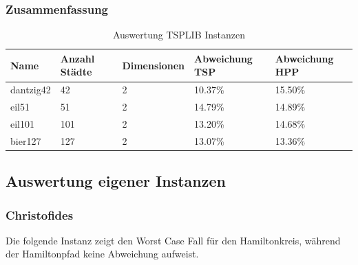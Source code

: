 \documentclass[11pt,a4paper]{article}
\begin{document}
\subsubsection{Zusammenfassung}
    \begin{table}[H]
                \centering
                \begin{tabular}{| p{2.0cm} | p{2.0cm} | p{2.5cm} | p{2.5cm} | p{2.5cm} |}
                    \hline
                    \small{\textbf{Name}} &
                    \small{\textbf{Anzahl Städte}}  & 
                    \small{\textbf{Dimensionen}} & 
                    \small{\textbf{Abweichung TSP}} & 
                    \small{\textbf{Abweichung HPP}} \\ \hline

                    dantzig42   & 42    & 2     & 10.37\%   & 15.50\%   \\ \hline
                    eil51       & 51    & 2     & 14.79\%   & 14.89\%   \\ \hline
                    eil101      & 101   & 2     & 13.20\%   & 14.68\%   \\ \hline
                    bier127     & 127   & 2     & 13.07\%   & 13.36\%   \\ \hline
               \end{tabular}
                \caption{Auswertung TSPLIB Instanzen}
                \label{tab:instanz_tsplib_instanzen}
        \end{table}

\subsection{Auswertung eigener Instanzen}
\subsubsection{Christofides}
Die folgende Instanz zeigt den Worst Case Fall für den Hamiltonkreis, während der Hamiltonpfad keine Abweichung aufweist.
\end{document}
